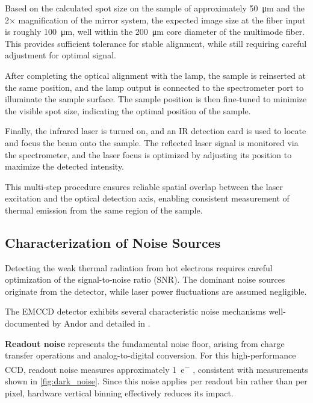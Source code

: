 \documentclass[
	parskip=half,
	a4paper,
]{scrarticle}
\begin{document}
Based on the calculated spot size on the sample of approximately \SI{50}{\micro\meter} and the 2$\times$ magnification of the mirror system, the expected image size at the fiber input is roughly \SI{100}{\micro\meter}, well within the \SI{200}{\micro\meter} core diameter of the multimode fiber. This provides sufficient tolerance for stable alignment, while still requiring careful adjustment for optimal signal.

After completing the optical alignment with the lamp, the sample is reinserted at the same position, and the lamp output is connected to the spectrometer port to illuminate the sample surface. The sample position is then fine-tuned to minimize the visible spot size, indicating the optimal position of the sample.

Finally, the infrared laser is turned on, and an IR detection card is used to locate and focus the beam onto the sample. The reflected laser signal is monitored via the spectrometer, and the laser focus is optimized by adjusting its position to maximize the detected intensity.

This multi-step procedure ensures reliable spatial overlap between the laser excitation and the optical detection axis, enabling consistent measurement of thermal emission from the same region of the sample.


\subsection{Characterization of Noise Sources}

Detecting the weak thermal radiation from hot electrons requires careful optimization of the signal-to-noise ratio (SNR). The dominant noise sources originate from the detector, while laser power fluctuations are assumed negligible.

The EMCCD detector exhibits several characteristic noise mechanisms well-documented by Andor \cite{andor_establishing_nodate,dr_jo_walters_sensitivity_2023} and detailed in \cite{european_machine_vision_association_standard_2010}.

\textbf{Readout noise} represents the fundamental noise floor, arising from charge transfer operations and analog-to-digital conversion. For this high-performance CCD, readout noise measures approximately \SI{1}{e^-} \cite{andor_ixonem_nodate}, consistent with measurements shown in \autoref{fig:dark_noise}. Since this noise applies per readout bin rather than per pixel, hardware vertical binning effectively reduces its impact.
\end{document}
